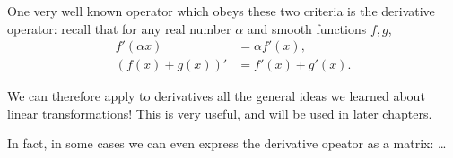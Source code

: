 One very well known operator which obeys these two criteria is the derivative operator: recall that for any real number $\alpha$ and smooth functions $f,g$,
\begin{align}
	f' \left( \alpha x \right) &= \alpha f'(x)\nonumber,\\
	\left( f(x)+g(x) \right)' &= f'(x) + g'(x).
	\label{eq:derivative_as_linear_opeator}
\end{align}

We can therefore apply to derivatives all the general ideas we learned about linear transformations! This is very useful, and will be used in later chapters.

In fact, in some cases we can even express the derivative opeator as a matrix: \ldots
{}
